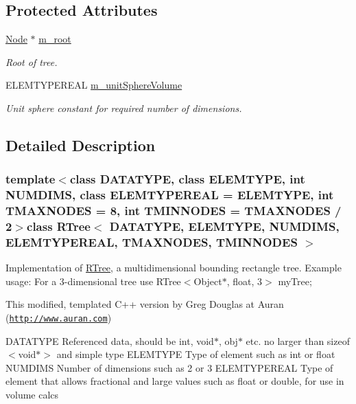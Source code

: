 \subsection*{Protected Attributes}
\begin{DoxyCompactItemize}
\item 
\hyperlink{structRTree_1_1Node}{Node} $\ast$ \hyperlink{classRTree_a5028f4e28918519bc70cb1f615316582}{m\-\_\-root}
\begin{DoxyCompactList}\small\item\em Root of tree. \end{DoxyCompactList}\item 
E\-L\-E\-M\-T\-Y\-P\-E\-R\-E\-A\-L \hyperlink{classRTree_af26d4beb8ce3a381ee75eabeec4727e3}{m\-\_\-unit\-Sphere\-Volume}
\begin{DoxyCompactList}\small\item\em Unit sphere constant for required number of dimensions. \end{DoxyCompactList}\end{DoxyCompactItemize}


\subsection{Detailed Description}
\subsubsection*{template$<$class D\-A\-T\-A\-T\-Y\-P\-E, class E\-L\-E\-M\-T\-Y\-P\-E, int N\-U\-M\-D\-I\-M\-S, class E\-L\-E\-M\-T\-Y\-P\-E\-R\-E\-A\-L = E\-L\-E\-M\-T\-Y\-P\-E, int T\-M\-A\-X\-N\-O\-D\-E\-S = 8, int T\-M\-I\-N\-N\-O\-D\-E\-S = T\-M\-A\-X\-N\-O\-D\-E\-S / 2$>$class R\-Tree$<$ D\-A\-T\-A\-T\-Y\-P\-E, E\-L\-E\-M\-T\-Y\-P\-E, N\-U\-M\-D\-I\-M\-S, E\-L\-E\-M\-T\-Y\-P\-E\-R\-E\-A\-L, T\-M\-A\-X\-N\-O\-D\-E\-S, T\-M\-I\-N\-N\-O\-D\-E\-S $>$}

Implementation of \hyperlink{classRTree}{R\-Tree}, a multidimensional bounding rectangle tree. Example usage\-: For a 3-\/dimensional tree use R\-Tree$<$\-Object$\ast$, float, 3$>$ my\-Tree;

This modified, templated C++ version by Greg Douglas at Auran (\href{http://www.auran.com}{\tt http\-://www.\-auran.\-com})

D\-A\-T\-A\-T\-Y\-P\-E Referenced data, should be int, void$\ast$, obj$\ast$ etc. no larger than sizeof$<$void$\ast$$>$ and simple type E\-L\-E\-M\-T\-Y\-P\-E Type of element such as int or float N\-U\-M\-D\-I\-M\-S Number of dimensions such as 2 or 3 E\-L\-E\-M\-T\-Y\-P\-E\-R\-E\-A\-L Type of element that allows fractional and large values such as float or double, for use in volume calcs

